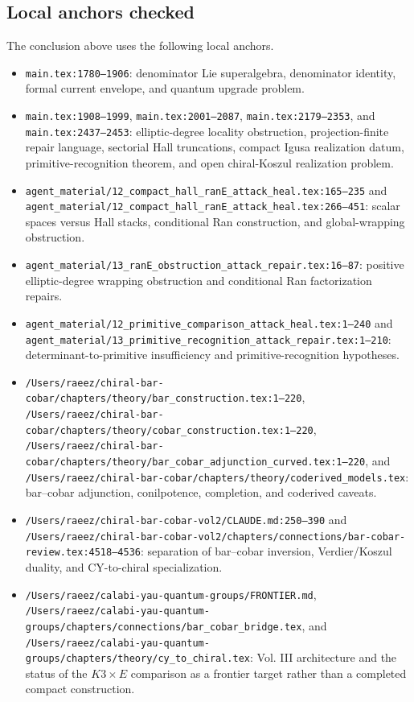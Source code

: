 \subsection{Local anchors checked}

The conclusion above uses the following local anchors.

\begin{itemize}
\item \texttt{main.tex:1780--1906}: denominator Lie superalgebra,
denominator identity, formal current envelope, and quantum upgrade
problem.
\item \texttt{main.tex:1908--1999}, \texttt{main.tex:2001--2087},
\texttt{main.tex:2179--2353}, and \texttt{main.tex:2437--2453}:
elliptic-degree locality obstruction, projection-finite repair
language, sectorial Hall truncations, compact Igusa realization datum,
primitive-recognition theorem, and open chiral-Koszul realization
problem.
\item
\texttt{agent\_material/12\_compact\_hall\_ranE\_attack\_heal.tex:165--235}
and
\texttt{agent\_material/12\_compact\_hall\_ranE\_attack\_heal.tex:266--451}:
scalar spaces versus Hall stacks, conditional Ran construction, and
global-wrapping obstruction.
\item
\texttt{agent\_material/13\_ranE\_obstruction\_attack\_repair.tex:16--87}:
positive elliptic-degree wrapping obstruction and conditional Ran
factorization repairs.
\item
\texttt{agent\_material/12\_primitive\_comparison\_attack\_heal.tex:1--240}
and
\texttt{agent\_material/13\_primitive\_recognition\_attack\_repair.tex:1--210}:
determinant-to-primitive insufficiency and primitive-recognition
hypotheses.
\item
\texttt{/Users/raeez/chiral-bar-cobar/chapters/theory/bar\_construction.tex:1--220},
\texttt{/Users/raeez/chiral-bar-cobar/chapters/theory/cobar\_construction.tex:1--220},
\texttt{/Users/raeez/chiral-bar-cobar/chapters/theory/bar\_cobar\_adjunction\_curved.tex:1--220},
and
\texttt{/Users/raeez/chiral-bar-cobar/chapters/theory/coderived\_models.tex}:
bar--cobar adjunction, conilpotence, completion, and coderived caveats.
\item
\texttt{/Users/raeez/chiral-bar-cobar-vol2/CLAUDE.md:250--390} and
\texttt{/Users/raeez/chiral-bar-cobar-vol2/chapters/connections/bar-cobar-review.tex:4518--4536}:
separation of
bar--cobar inversion, Verdier/Koszul duality, and CY-to-chiral
specialization.
\item
\texttt{/Users/raeez/calabi-yau-quantum-groups/FRONTIER.md},
\texttt{/Users/raeez/calabi-yau-quantum-groups/chapters/connections/bar\_cobar\_bridge.tex},
and
\texttt{/Users/raeez/calabi-yau-quantum-groups/chapters/theory/cy\_to\_chiral.tex}:
Vol. III architecture and
the status of the \(K3\times E\) comparison as a frontier target rather
than a completed compact construction.
\end{itemize}
